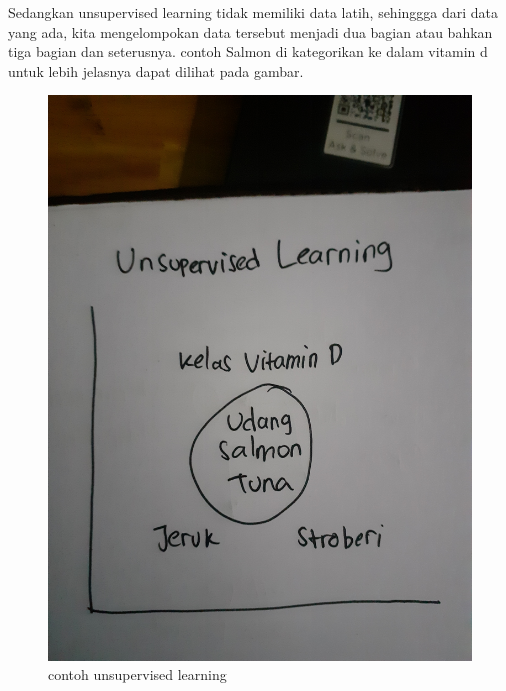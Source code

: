 \begin{enumerate}
		Sedangkan unsupervised learning tidak memiliki data latih, sehinggga dari data yang ada, kita mengelompokan data tersebut menjadi dua bagian atau bahkan tiga bagian dan seterusnya. contoh Salmon di kategorikan ke dalam vitamin d untuk lebih jelasnya dapat dilihat pada gambar.\par
		\begin{figure}[ht]
			\centering
			\includegraphics[scale=0.01]{figures/1174043/chapter2/3.jpg}
			\caption{contoh unsupervised learning}
			\label{contoh}
		\end{figure}
		

\end{enumerate}
